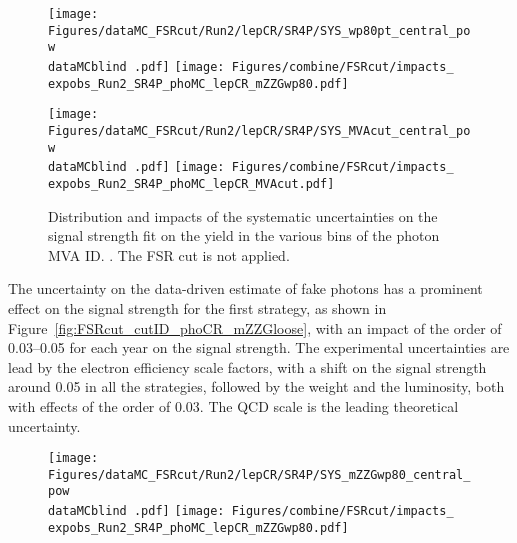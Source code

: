 \begin{figure}
  \centering
  \texttt{[image: Figures/dataMC\_FSRcut/Run2/lepCR/SR4P/SYS\_wp80pt\_central\_pow\\dataMCblind .pdf]}
  \hfill
  \texttt{[image: Figures/combine/FSRcut/impacts\_\\expobs\_Run2\_SR4P\_phoMC\_lepCR\_mZZGwp80.pdf]}
  \caption{}
  \label{fig:FSRcut_mvaID_phoMC_mZZGwp80}
\end{figure}

\begin{figure}
  \centering
  \texttt{[image: Figures/dataMC\_FSRcut/Run2/lepCR/SR4P/SYS\_MVAcut\_central\_pow\\dataMCblind .pdf]}
  \hfill
  \texttt{[image: Figures/combine/FSRcut/impacts\_\\expobs\_Run2\_SR4P\_phoMC\_lepCR\_MVAcut.pdf]}
  \caption{Distribution and impacts of the systematic uncertainties on the signal strength fit
    on the yield in the various bins of the photon MVA ID.
    .
    The FSR cut is not applied.
  }
  \label{fig:FSRcut_kin_phoMC_MVAcut}
\end{figure}

The uncertainty on the data-driven estimate of fake photons has a prominent effect on the signal strength for the first strategy,
as shown in Figure~\ref{fig:FSRcut_cutID_phoCR_mZZGloose},
with an impact of the order of 0.03--0.05 for each year on the signal strength.
The experimental uncertainties are lead by the electron efficiency scale factors,
with a shift on the signal strength around 0.05 in all the strategies,
followed by the \pileup{} weight and the luminosity,
both with effects of the order of 0.03.
The QCD scale is the leading theoretical uncertainty.

\begin{figure}
  \renewcommand{\dataMCblind}{}
  \renewcommand{\expobs}{observed}
  \centering
  \texttt{[image: Figures/dataMC\_FSRcut/Run2/lepCR/SR4P/SYS\_mZZGwp80\_central\_pow\\dataMCblind .pdf]}
  \hfill
  \texttt{[image: Figures/combine/FSRcut/impacts\_\\expobs\_Run2\_SR4P\_phoMC\_lepCR\_mZZGwp80.pdf]}
  \caption{}
  \label{fig:impacts_observed_FSRcut_Run2_SR4P}
\end{figure}
